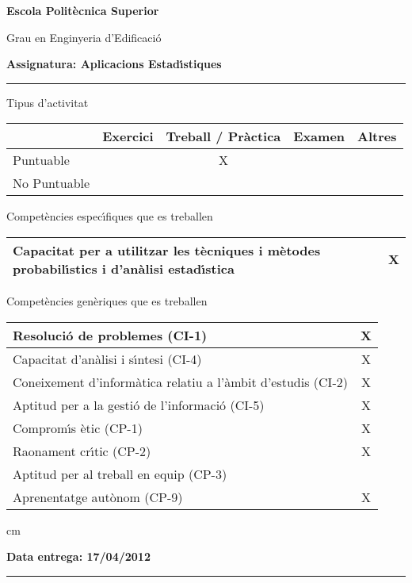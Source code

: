 \documentclass[11pt]{article}
\begin{document}
\noindent
{\large \bf Escola Polit\`ecnica Superior}

\noindent
{\large Grau en Enginyeria d'Edificaci\'o}

\vskip 0.3cm
\noindent
{\large \bf Assignatura: Aplicacions Estad\'\i stiques}

\hrule

\vskip 0.3cm

\noindent
Tipus d'activitat

\begin{tabular}{|l|c|c|c|c|}
\hline
 & Exercici & Treball / Pr\`actica & Examen & Altres \\
\hline
Puntuable & & X &  & \\ \hline
No Puntuable & & & & \\ \hline
\end{tabular}

\vskip 0.3cm

\noindent
Compet\`encies espec\'\i fiques que es treballen

\begin{tabular}{|l|c|}
\hline
Capacitat per a utilitzar les t\`ecniques i m\`etodes probabil\'\i stics i d'an\`alisi estad\'\i stica & X \\
\hline
\end{tabular}

\vskip 0.3cm

\noindent
Compet\`encies gen\`eriques que es treballen

\begin{tabular}{|l|c|}
\hline
Resoluci\'o de problemes (CI-1) & X \\ \hline
Capacitat d'an\`alisi i s\'\i ntesi (CI-4) & X \\ \hline
Coneixement d'inform\`atica relatiu a l'\`ambit d'estudis (CI-2) & X \\ \hline
Aptitud per a la gesti\'o de l'informaci\'o (CI-5) & X\\ \hline
Comprom\'\i s \`etic (CP-1) & X \\ \hline
Raonament cr\'\i tic (CP-2) & X \\ \hline
Aptitud per al treball en equip (CP-3) &  \\ \hline
Aprenentatge aut\`onom (CP-9) & X\\ \hline
\end{tabular}


 cm

\noindent
\textbf{Data entrega: 17/04/2012}

\hrule
\end{document}
